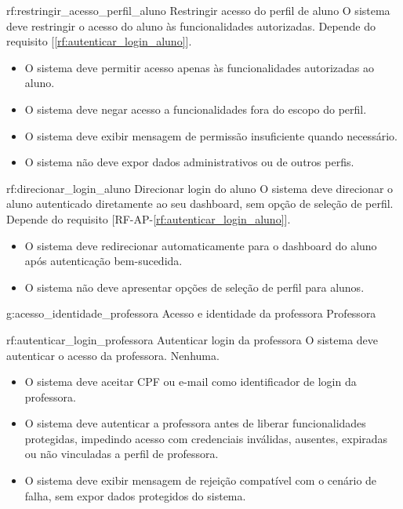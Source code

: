 \reqfunc
{rf:restringir_acesso_perfil_aluno}
{Restringir acesso do perfil de aluno}
{O sistema deve restringir o acesso do aluno às funcionalidades autorizadas.}
{Depende do requisito [\ref{rf:autenticar_login_aluno}].}
{\begin{itemize}[leftmargin=0.6cm]
    \item O sistema deve permitir acesso apenas às funcionalidades autorizadas ao aluno.
    \item O sistema deve negar acesso a funcionalidades fora do escopo do perfil.
    \item O sistema deve exibir mensagem de permissão insuficiente quando necessário.
    \item O sistema não deve expor dados administrativos ou de outros perfis.
\end{itemize}}

\reqfunc
{rf:direcionar_login_aluno}
{Direcionar login do aluno}
{O sistema deve direcionar o aluno autenticado diretamente ao seu dashboard, sem opção de seleção de perfil.}
{Depende do requisito [RF-AP-\ref{rf:autenticar_login_aluno}].}
{\begin{itemize}[leftmargin=0.6cm]
    \item O sistema deve redirecionar automaticamente para o dashboard do aluno após autenticação bem-sucedida.
    \item O sistema não deve apresentar opções de seleção de perfil para alunos.
\end{itemize}}
\rfgruporeqator
{g:acesso_identidade_professora}
{Acesso e identidade da professora}
{Professora}

\reqfunc
{rf:autenticar_login_professora}
{Autenticar login da professora}
{O sistema deve autenticar o acesso da professora.}
{Nenhuma.}
{\begin{itemize}[leftmargin=0.6cm]
    \item O sistema deve aceitar CPF ou e-mail como identificador de login da professora.
    \item O sistema deve autenticar a professora antes de liberar funcionalidades protegidas, impedindo acesso com credenciais inválidas, ausentes, expiradas ou não vinculadas a perfil de professora.
    \item O sistema deve exibir mensagem de rejeição compatível com o cenário de falha, sem expor dados protegidos do sistema.
\end{itemize}}

